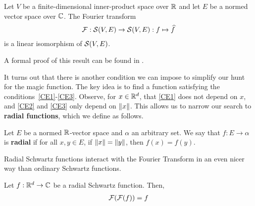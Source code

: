 \begin{boxtheorem}\label{Ch3:Thm:FourierSchwartz_CLE}
    Let $V$ be a finite-dimensional inner-product space over $\mathbb{R}$ and let $E$ be a normed vector space over $\mathbb{C}$. The Fourier transform
    \begin{align*}
        \mathcal{F} : \mathcal{S}(V, E) \to \mathcal{S}(V, E) : f \mapsto \widehat{f}
    \end{align*}
    is a linear isomorphism of $\mathcal{S}(V, E)$. %
\end{boxtheorem}

A formal proof of this result can be found in \mathlib.

It turns out that there is another condition we can impose to simplify our hunt for the magic function. The key idea is to find a function satisfying the conditions~\ref{CE1}-\ref{CE3}. Observe, for $x \in \mathbb{R}^d$, that \ref{CE1} does not depend on $x$, and \ref{CE2} and \ref{CE3} only depend on $\left\lVert x \right\rVert$. This allows us to narrow our search to \textbf{radial functions}, which we define as follows.

\begin{boxdefinition}
    Let $E$ be a normed $\mathbb{R}$-vector space and $\alpha$ an arbitrary set. We say that $f : E \to \alpha$ is \textbf{radial} if for all $x, y \in E$, if $\left\lVert x \right\rVert = \left\lVert y \right\rVert$, then $f(x) = f(y)$.
\end{boxdefinition}

Radial Schwartz functions interact with the Fourier Transform in an even nicer way than ordinary Schwartz functions.

\begin{boxproposition}\label{Ch3:Prop:RadialSchwartzFourier}
    Let $f : \mathbb{R}^d \to \mathbb{C}$ be a radial Schwartz function. Then,
    \begin{align*}
        \mathcal{F}\!\left( \mathcal{F}\!\left( f \right) \right) = f
    \end{align*}
\end{boxproposition}

